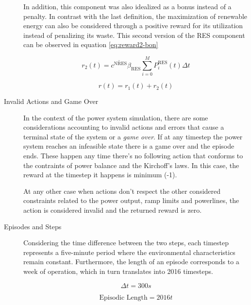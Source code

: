 \begin{description}
	In addition, this component was also idealized as a bonus instead of a penalty. In contrast with the last definition, the maximization of renewable energy can also be considered through a positive reward for its utilization instead of penalizing its waste. This second version of the \ac{RES} component can be observed in equation \ref{eq:reward2-bon}\par
	
	\begin{equation} \label{eq:reward2-bon}
		r_2(t) = \overline{c^\text{NRES}} \beta_\text{RES} \sum^M_{i=0} P^\text{RES}_i(t) \Delta t 
	\end{equation}
	
	\begin{equation}
		r(t) = r_1(t) + r_2(t)
	\end{equation}
	
	\item[Invalid Actions and Game Over] In the context of the power system simulation, there are some considerations accounting to invalid actions and errors that cause a terminal state of the system or a \textit{game over}. If at any timestep the power system reaches an infeasible state there is a game over and the episode ends. These happen any time there's no following action that conforms to the contraints of power balance and the Kirchoff's laws. In this case, the reward at the timestep it happens is minimum (-1). \par
	At any other case when actions don't respect the other considered constraints related to the power output, ramp limits and powerlines, the action is considered invalid and the returned reward is zero.
	
	
	\item[Episodes and Steps] Considering the time difference between the two steps, each timestep represents a five-minute period where the environmental characteristics remain constant. Furthermore, the length of an episode corresponds to a week of operation, which in turn translates into 2016 timesteps. \par

	
	\begin{equation}
		\Delta t = 300 s
	\end{equation}
	
	\begin{equation}
		\text{Episodic Length} = 2016 t
	\end{equation}
	
\end{description}

